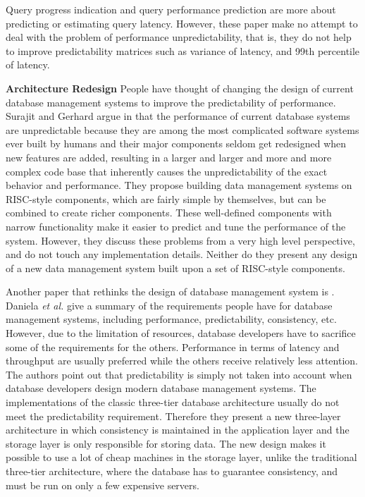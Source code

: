 Query progress indication and query performance prediction are more about
predicting or estimating query latency. However, these paper make no attempt
to deal with the problem of performance unpredictability, that is, they do not
help to improve predictability matrices such as variance of latency, and 99th
percentile of latency.

\textbf{Architecture Redesign} People have thought of changing the design of
current database management systems to improve the predictability of 
performance. Surajit and Gerhard argue in \cite{chaudhuri:rethinking} that the 
performance of current database systems are unpredictable because they are
among the most complicated software systems ever built by humans and their
major components seldom get redesigned when new features are added, resulting
in a larger and larger and more and more complex code base that inherently
causes the unpredictability of the exact behavior and performance. They propose
building data management systems on RISC-style components, which are fairly
simple by themselves, but can be combined to create richer components. These
well-defined components with narrow functionality make it easier to predict and
tune the performance of the system. However, they discuss these problems from a
very high level perspective, and do not touch any implementation details. 
Neither do they present any design of a new data management system built upon a
set of RISC-style components.

Another paper that rethinks the design of database management system is
\cite{florescu:rethinking}. Daniela \textit{et al.} give a summary of the
requirements people have for database management systems, including 
performance, predictability, consistency, etc. However, due to the limitation
of resources, database developers have to sacrifice some of the requirements
for the others. Performance in terms of latency and throughput are usually
preferred while the others receive relatively less attention. The authors
point out that predictability is simply not taken into account when database 
developers design modern database management systems. The implementations of
the classic three-tier database architecture usually do not meet the
predictability requirement. Therefore they present a new three-layer
architecture in which consistency is maintained in the application layer and
the storage layer is only responsible for storing data. The new design makes it
possible to use a lot of cheap machines in the storage layer, unlike the
traditional three-tier architecture, where the database has to guarantee
consistency, and must be run on only a few expensive servers.

